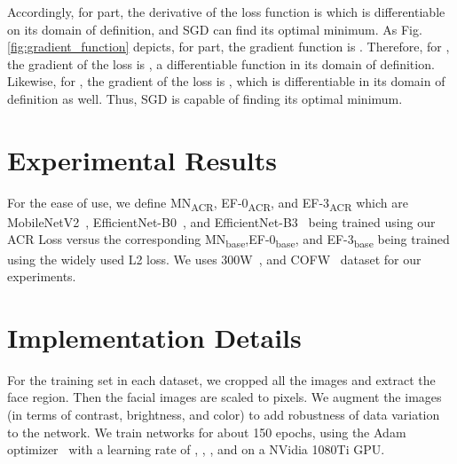 \documentclass[a4paper,conference]{IEEEtran}
\begin{document}
Accordingly, for  part, the derivative of the loss function is  which is differentiable on its domain of definition, and SGD can find its optimal minimum. As Fig.\ref{fig:gradient_function} depicts, for  part, the gradient function is . Therefore, for , the gradient of the loss is , a differentiable function in its domain of definition. Likewise, for , the gradient of the loss is , which is differentiable in its domain of definition as well. Thus, SGD is capable of finding its
optimal minimum.
 
\section{Experimental Results} \label{sec:experiment}
For the ease of use, we define MN\textsubscript{ACR}, EF-0\textsubscript{ACR}, and EF-3\textsubscript{ACR} which are MobileNetV2~\cite{sandler2018mobilenetv2}, EfficientNet-B0~\cite{tan2020efficientnet}, and EfficientNet-B3~\cite{tan2020efficientnet} being trained using our ACR Loss versus the corresponding MN\textsubscript{base},EF-0\textsubscript{base}, and EF-3\textsubscript{base} being trained using the widely used L2 loss. We uses 300W~\cite{sagonas2013300}, and COFW~\cite{burgos2013robust} dataset for our experiments.

\section{Implementation Details}
For the training set in each dataset, we cropped all the images and extract the face region. Then the facial images are scaled to  pixels. We augment the images (in terms of contrast, brightness, and color) to add robustness of data variation to the network. We train networks for about 150 epochs, using the Adam optimizer~\cite{kingma2014adam} with a learning rate of , , , and  on a NVidia 1080Ti GPU.
\end{document}
